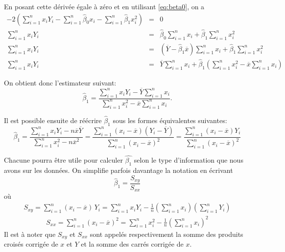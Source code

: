 \newpage
En posant cette dérivée égale à zéro et en utilisant  \eqref{eq:beta0}, on a
\begin{eqnarray*}
-2 \left( \sum_{i=1}^n x_i Y_i - \sum_{i=1}^n  \hat\beta_0 x_i - \sum_{i=1}^n  \hat\beta_1 x_i^2\right) & = & 0 \\
\sum_{i=1}^n x_i Y_i &= & \hat\beta_0 \sum_{i=1}^n x_i + \hat\beta_1 \sum_{i=1}^nx_i^2 \\
\sum_{i=1}^n x_i Y_i & = & (\overline{Y}-\hat\beta_1 \overline{x}) \sum_{i=1}^n x_i + \hat\beta_1 \sum_{i=1}^nx_i^2 \\
\sum_{i=1}^n x_i Y_i & = & \overline{Y} \sum_{i=1}^n x_i + \hat\beta_1 \left(\sum_{i=1}^n x_i^2 - \overline{x}\sum_{i=1}^n x_i \right)
\end{eqnarray*}

On obtient donc l'estimateur suivant:
\begin{equation}
\hat{\beta}_1 = \frac{\sum_{i=1}^n x_i Y_i -\overline{Y} \sum_{i=1}^n x_i}{\sum_{i=1}^n x_i^2 - \overline{x}\sum_{i=1}^n x_i}.
\end{equation}


Il est possible ensuite de réécrire $\hat\beta_1$ sous les formes équivalentes suivantes:
\begin{equation*}
 \hat{\beta}_1 =  \frac{\sum_{i=1}^n x_i Y_i - n\overline{x}\overline{Y}}{\sum_{i=1}^n x_i^2 - n\overline{x}^2}
 = \frac{\sum_{i=1}^n (x_i-\overline{x})(Y_i-\overline{Y})}{\sum_{i=1}^n (x_i-\overline{x})^2}
 = \frac{\sum_{i=1}^n (x_i-\overline{x})Y_i}{\sum_{i=1}^n (x_i-\overline{x})^2}
 \label{eq:beta1}
\end{equation*}

Chacune pourra être utile pour calculer $\hat{\beta_1}$ selon le type d'information que nous avons sur les données. On simplifie parfois davantage la notation en écrivant
\begin{equation}
 \hat{\beta}_1  = \frac{S_{xy}}{S_{xx}}
\end{equation}
o\`u
\begin{eqnarray}
S_{xy}=\sum_{i=1}^n (x_i-\overline x)\,Y_i=\sum_{i=1}^nx_iY_i-\frac{1}{n}\left(\sum_{i=1}^n x_i\right)\left(\sum_{i=1}^n Y_i\right)
\label{eq:Sxy}
\end{eqnarray}
\begin{eqnarray}
S_{xx}=\sum_{i=1}^n(x_i-\overline x)^2=\sum_{i=1}^nx_i^2-\frac{1}{n}\left(\sum_{i=1}^n x_i\right)^2
\label{eq:Sxx}
\end{eqnarray}
Il est à noter que $S_{xy}$ et $S_{xx}$ sont appelés respectivement la somme des produits croisés corrigée de $x$ et $Y$ et la somme des carrés corrigée de $x$.



